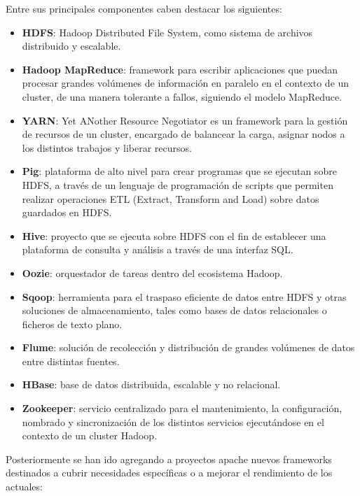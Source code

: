 Entre sus principales componentes caben destacar los siguientes:

\begin{itemize}
\item \textbf{HDFS}: Hadoop Distributed File System, como sistema de archivos
  distribuido y escalable. 
\item \textbf{Hadoop MapReduce}: framework para escribir aplicaciones que puedan
  procesar grandes volúmenes de información en paralelo en el contexto de un
  cluster, de una manera tolerante a fallos, siguiendo el modelo MapReduce. 
\item \textbf{YARN}: Yet ANother Resource Negotiator es un framework para la
  gestión de recursos de un cluster, encargado de balancear la carga, asignar
  nodos a los distintos trabajos y liberar recursos. 
\item \textbf{Pig}: plataforma de alto nivel para crear programas que se
  ejecutan sobre HDFS, a través de un lenguaje de programación de scripts que
  permiten realizar operaciones ETL (Extract, Transform and Load) sobre datos
  guardados en HDFS. 
\item \textbf{Hive}: proyecto que se ejecuta sobre HDFS con el fin de establecer
  una plataforma de consulta y análisis a través de una interfaz SQL. 
\item \textbf{Oozie}: orquestador de tareas dentro del ecosistema Hadoop. 
\item \textbf{Sqoop}: herramienta para el traspaso eficiente de datos entre HDFS
  y otras soluciones de almacenamiento, tales como bases de datos relacionales o
  ficheros de texto plano. 

\item \textbf{Flume}: solución de recolección y distribución de grandes
  volúmenes de datos entre distintas fuentes.
\item \textbf{HBase}: base de datos distribuida, escalable y no relacional. 
\item \textbf{Zookeeper}: servicio centralizado para el mantenimiento, la
  configuración, nombrado y sincronización de los distintos servicios
  ejecutándose en el contexto de un cluster Hadoop. 
\end{itemize}

Posteriormente se han ido agregando a proyectos apache nuevos frameworks
destinados a cubrir necesidades específicas o a mejorar el rendimiento de los
actuales:

